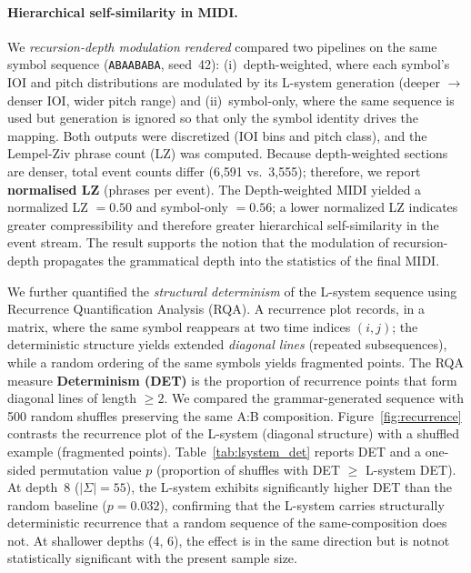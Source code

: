 \documentclass[a4paper]{article}
\theoremstyle{definition}
\theoremstyle{remark}
\begin{document}
\paragraph{Hierarchical self-similarity in MIDI.}
We \emph{recursion-depth modulation} \emph{rendered} compared two pipelines on the same symbol sequence (\texttt{ABAABABA}, seed~42): (i)~depth-weighted, where each symbol's IOI and pitch distributions are modulated by its L-system generation (deeper $\rightarrow$ denser IOI, wider pitch range) and (ii)~symbol-only, where the same sequence is used but generation is ignored so that only the symbol identity drives the mapping. Both outputs were discretized (IOI bins and pitch class), and the Lempel-Ziv phrase count (LZ) was computed. Because depth-weighted sections are denser, total event counts differ (6{,}591 vs.\ 3{,}555); therefore, we report \textbf{normalised LZ} (phrases per event). The Depth-weighted MIDI yielded a normalized LZ $= 0.50$ and symbol-only $= 0.56$; a lower normalized LZ indicates greater compressibility and therefore greater hierarchical self-similarity in the event stream. The result supports the notion that the modulation of recursion-depth propagates the grammatical depth into the statistics of the final MIDI. 

We further quantified the \emph{structural determinism} of the L-system sequence using Recurrence Quantification Analysis (RQA). A recurrence plot records, in a matrix, where the same symbol reappears at two time indices $(i,j)$; the deterministic structure yields extended \emph{diagonal lines} (repeated subsequences), while a random ordering of the same symbols yields fragmented points. The RQA measure \textbf{Determinism (DET)} is the proportion of recurrence points that form diagonal lines of length $\geq 2$. We compared the grammar-generated sequence with 500 random shuffles preserving the same A:B composition. Figure~\ref{fig:recurrence} contrasts the recurrence plot of the L-system (diagonal structure) with a shuffled example (fragmented points). Table~\ref{tab:lsystem_det} reports DET and a one-sided permutation value $p$ (proportion of shuffles with DET $\geq$ L-system DET). At depth~8 ($|\Sigma|=55$), the L-system exhibits significantly higher DET than the random baseline ($p = 0.032$), confirming that the L-system carries structurally deterministic recurrence that a random sequence of the same-composition does not. At shallower depths (4, 6), the effect is in the same direction but is notnot statistically significant with the present sample size. 
\end{document}
